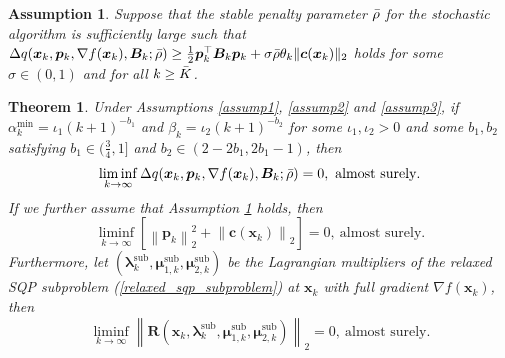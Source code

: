 \documentclass[aos]{imsart}
\numberwithin{equation}{section}
\theoremstyle{plain}
\newtheorem{assumption}{Assumption}
\newtheorem{theorem}{Theorem}
\begin{document}
\begin{assumption}
\label{assump8}
    Suppose that the stable penalty parameter $\Bar{\rho}$ for the stochastic algorithm is sufficiently large such that 
    $\Delta q(\bm{x}_k,\bm{p}_k,\nabla f(\bm{x}_k),\bm{B}_k;\Bar{\rho}) \geq \frac{1}{2} \bm{p}_k^{\top} \bm{B}_k \bm{p}_k + \sigma \Bar{\rho} \theta_k \|\bm{c}(\bm{x}_k)\|_2$ holds for some $\sigma \in (0,1)$ and for all $k \geq \Bar{K}$. 
    
\end{assumption}


\begin{theorem}
\label{theorem_lim_inf}
    Under Assumptions \ref{assump1}, \ref{assump2} and \ref{assump3}, if $\alpha_k^{\text{min}} = \iota_1 (k+1)^{-b_1}$ and $\beta_k = \iota_2 (k+1)^{-b_2}$ for some $\iota_1, \iota_2 >0$ and some $b_1, b_2$ satisfying $b_1 \in (\frac{3}{4},1]$ and $b_2 \in \left( 2-2b_1,2b_1-1\right)$, then  
    \begin{equation*}
        \mathop{\lim \inf}_{k \to \infty} \Delta q(\bm{x}_k,\bm{p}_k,\nabla f(\bm{x}_k),\bm{B}_k;\Bar{\rho}) = 0,~\text{almost surely}.
    \end{equation*}
    If we further assume that Assumption \ref{assump8} holds, then
    \begin{equation*}
        \mathop{\lim \inf}_{k \to \infty} \left[\left\|\bm{p}_k\right\|_2^2 + \left\|\bm{c}(\bm{x}_k) \right\|_2 \right] = 0,~\text{almost surely}.
    \end{equation*}
    Furthermore, let $(\bm{\lambda}_k^{\text{sub}}, \bm{\mu}_{1,k}^{\text{sub}},\bm{\mu}_{2,k}^{\text{sub}})$ be the Lagrangian multipliers of the relaxed SQP subproblem (\ref{relaxed_sqp_subproblem}) at $\bm{x}_k$ with full gradient $\nabla f(\bm{x}_k)$, then 
    \begin{equation}
        \mathop{\lim \inf}_{k \to \infty} \left\| \bm{R}(\bm{x}_k, \bm{\lambda}_k^{\text{sub}}, \bm{\mu}_{1,k}^{\text{sub}}, \bm{\mu}_{2,k}^{\text{sub}}) \right\|_2 = 0,~\text{almost surely}.
    \end{equation}
\end{theorem}
\end{document}
